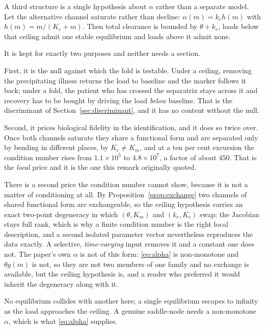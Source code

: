 \begin{remark}
\label{rem:ceiling}
A third structure is a single hypothesis about $\alpha$ rather than a separate model. Let
the alternative
channel saturate rather than decline: $\alpha(m) = k_e h(m)$ with $h(m) = m/(K_e+m)$. Then
total clearance is bounded by $\theta + k_e$, loads below that ceiling admit one stable
equilibrium and loads above it admit none.

It is kept for exactly two purposes and neither needs a section.

First, it is the null against which the fold is testable. Under a ceiling, removing
the precipitating illness returns the load to baseline and the marker follows it back; under
a fold, the patient who has crossed the separatrix stays across it and recovery has to be
bought by driving the load \emph{below} baseline. That is the discriminant of
Section~\ref{sec:discriminant}, and it has no content without the null.

Second, it prices biological fidelity in the identification, and it does so twice
over. Once both channels saturate they share a functional form and are separated only by
bending in different places, by $K_e \neq K_m$, and at a ten per cent excursion the
condition number rises from $1.1\times10^{5}$ to $4.8\times10^{7}$, a factor of about
$450$. That is the \emph{local} price and it is the one this remark originally quoted.

There is a second price the condition number cannot show, because it is not a matter of
conditioning at all. By Proposition~\ref{prop:exchange} two channels of shared functional
form are exchangeable, so the ceiling hypothesis carries an exact two-point degeneracy in which
$(\theta, K_m)$ and $(k_e, K_e)$ swap: the Jacobian stays full rank, which is why a finite
condition number is the right local description, and a second isolated parameter vector
nevertheless reproduces the data exactly. A selective, \emph{time-varying} input removes it
and a constant one does not. The paper's own $\alpha$ is not of this form: \eqref{eq:alpha}
is non-monotone and $\theta g(m)$ is not, so they are not two members of one family and no
exchange is available, but the ceiling hypothesis is, and a reader who preferred it would
inherit the degeneracy along with it.

No equilibrium collides with another here; a single equilibrium escapes to infinity as the
load approaches the ceiling. A genuine saddle-node needs a non-monotone $\alpha$, which is
what \eqref{eq:alpha} supplies.
\end{remark}

